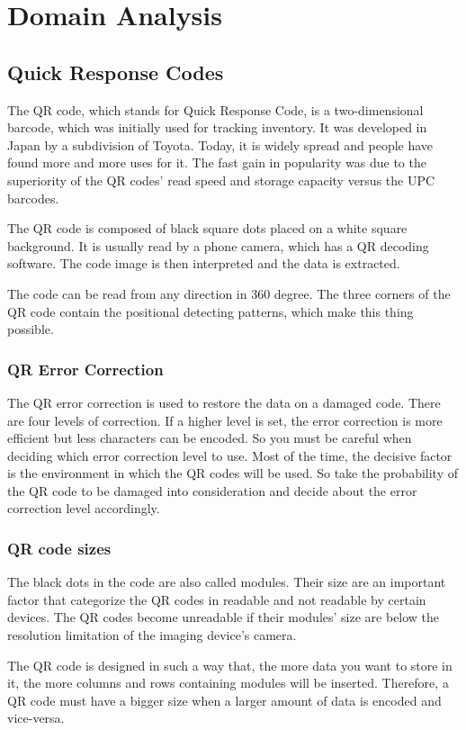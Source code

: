 \section{Domain Analysis}

\subsection{Quick Response Codes}
The QR code, which stands for Quick Response Code, is a two-dimensional barcode, which was initially used for tracking inventory. It was developed in Japan by a subdivision of Toyota. Today, it is widely spread and people have found more and more uses for it. The fast gain in popularity was due to the superiority of the QR codes’ read speed and storage capacity versus the UPC barcodes.

The QR code is composed of black square dots placed on a white square background. It is usually read by a phone camera, which has a QR decoding software. The code image is then interpreted and the data is extracted.

The code can be read from any direction in 360 degree. The three corners of the QR code contain the positional detecting patterns, which make this thing possible.

\subsubsection{QR Error Correction}
The QR error correction is used to restore the data on a damaged code. There are four levels of correction. If a higher level is set, the error correction is more efficient but less characters can be encoded. So you must be careful when deciding which error correction level to use. Most of the time, the decisive factor is the environment in which the QR codes will be used. So take the probability of the QR code to be damaged into consideration and decide about the error correction level accordingly.

\subsubsection{QR code sizes}
The black dots in the code are also called modules. Their size are an important factor that categorize the QR codes in readable and not readable by certain devices. The QR codes become unreadable if their modules’ size are below the resolution limitation of the imaging device’s camera.

The QR code is designed in such a way that, the more data you want to store in it, the more columns and rows containing modules will be inserted. Therefore, a QR code must have a bigger size when a larger amount of data is encoded and vice-versa.

